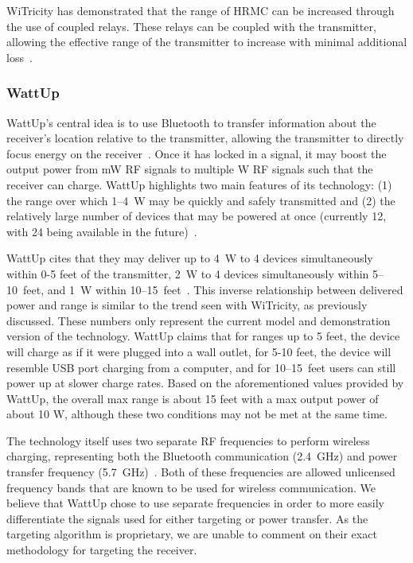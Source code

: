 WiTricity has demonstrated that the range of HRMC can be increased through the use of coupled relays. These relays can be coupled with the transmitter, allowing the effective range of the transmitter to increase with minimal additional loss~\cite{butler_tour_2013}.

\subsubsection{WattUp}
WattUp's central idea is to use Bluetooth to transfer information about the receiver's location relative to the transmitter, allowing the transmitter to directly focus energy on the receiver~\cite{energouscorporation2016}. Once it has locked in a signal, it may boost the output power from mW RF signals to multiple W RF signals such that the receiver can charge. WattUp highlights two main features of its technology: (1) the range over which \numrange{1}{4}~W may be quickly and safely transmitted and (2) the relatively large number of devices that may be powered at once (currently 12, with 24 being available in the future)~\cite{energouscorporation2016}.

WattUp cites that they may deliver up to 4~W to 4 devices simultaneously within 0-5 feet of the transmitter, 2~W to 4 devices simultaneously within \numrange{5}{10}~feet, and 1~W within \numrange{10}{15}~feet~\cite{energouscorporation2016}. This inverse relationship between delivered power and range is similar to the trend seen with WiTricity, as previously discussed. These numbers only represent the current model and demonstration version of the technology. WattUp claims that for ranges up to 5 feet, the device will charge as if it were plugged into a wall outlet, for 5-10 feet, the device will resemble USB port charging from a computer, and for \numrange{10}{15}~feet users can still power up at slower charge rates. Based on the aforementioned values provided by WattUp, the overall max range is about 15 feet with a max output power of about 10 W, although these two conditions may not be met at the same time.

The technology itself uses two separate RF frequencies to perform wireless charging, representing both the Bluetooth communication (2.4~GHz) and power transfer frequency (5.7~GHz)~\cite{energouscorporation2016}. Both of these frequencies are allowed unlicensed frequency bands that are known to be used for wireless communication. We believe that WattUp chose to use separate frequencies in order to more easily differentiate the signals used for either targeting or power transfer. As the targeting algorithm is proprietary, we are unable to comment on their exact methodology for targeting the receiver.

